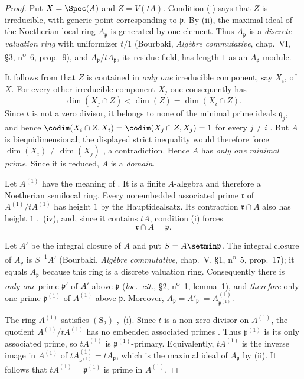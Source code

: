 \begin{proof}
Put $X=\Spec(A)$ and $Z=V(tA)$.  Condition {\rm(i)} says that
$Z$ is irreducible, with generic point corresponding to
$\mathfrak p$.  By {\rm(ii)}, the maximal ideal of the
Noetherian local ring $A_{\mathfrak p}$ is generated by one
element.  Thus $A_{\mathfrak p}$ is a \emph{discrete valuation ring}
with uniformizer $t/1$ (Bourbaki, \emph{Alg\`ebre commutative},
chap.~VI, \S3, n\textsuperscript{o}~6, prop.~9), and
$A_{\mathfrak p}/tA_{\mathfrak p}$, its residue field, has length
$1$ as an $A_{\mathfrak p}$-module.

It follows from  that $Z$ is contained in \emph{only one}
irreducible component, say $X_i$, of $X$.  For every other
irreducible component $X_j$ one consequently has
\[
  \dim(X_j\cap Z)<\dim(Z)=\dim(X_i\cap Z).
\]
Since $t$ is not a zero divisor, it belongs to none of the
minimal prime ideals $\mathfrak q_j$, and hence $\codim(X_i\cap Z,X_i)
=\codim(X_j\cap Z,X_j)=1$
for every $j\ne i$ .  But $A$ is
biequidimensional; the displayed strict inequality would
therefore force $\dim(X_i)\ne\dim(X_j)$
, a contradiction.  Hence $A$ has \emph{only one
minimal prime}.  Since it is reduced, $A$ is a \emph{domain}.

Let $A^{(1)}$ have the meaning of .  It is a
finite $A$-algebra and therefore a Noetherian semilocal ring.
Every nonembedded associated prime $\mathfrak r$ of
$A^{(1)}/tA^{(1)}$ has height $1$ by the Hauptidealsatz.  Its
contraction $\mathfrak r\cap A$ also has height $1$
,~(iv), and, since it contains $tA$, condition
{\rm(i)} forces
\[
  \mathfrak r\cap A=\mathfrak p.
\]

Let $A'$ be the integral closure of $A$ and put
$S=A\setmin\mathfrak p$.  The integral closure of $A_{\mathfrak p}$ is
$S^{-1}A'$ (Bourbaki, \emph{Alg\`ebre commutative}, chap.~V,
\S1, n\textsuperscript{o}~5, prop.~17); it equals $A_{\mathfrak p}$ because this
ring is a discrete valuation ring.  Consequently there is \emph{only
one} prime $\mathfrak p'$ of $A'$ above $\mathfrak p$
(\emph{loc.\ cit.}, \S2, n\textsuperscript{o}~1, lemma~1), and \emph{therefore} only one
prime $\mathfrak p^{(1)}$ of $A^{(1)}$ above $\mathfrak p$.
Moreover, $A_{\mathfrak p}=A'_{\mathfrak p'}
=A^{(1)}_{\mathfrak p^{(1)}}$.


The ring $A^{(1)}$ satisfies $(\mathrm S_2)$
,~(i).  Since $t$ is a non-zero-divisor on
$A^{(1)}$, the quotient $A^{(1)}/tA^{(1)}$
has no embedded associated primes .  Thus
$\mathfrak p^{(1)}$ is its only associated prime, so
$tA^{(1)}$ is $\mathfrak p^{(1)}$-primary.  Equivalently,
$tA^{(1)}$ is the inverse image in $A^{(1)}$ of $tA^{(1)}_{\mathfrak p^{(1)}}=tA_{\mathfrak p}$,
which is the maximal ideal of $A_{\mathfrak p}$ by {\rm(ii)}.
It follows that $tA^{(1)}=\mathfrak p^{(1)}$
is prime in $A^{(1)}$.


\end{proof}
